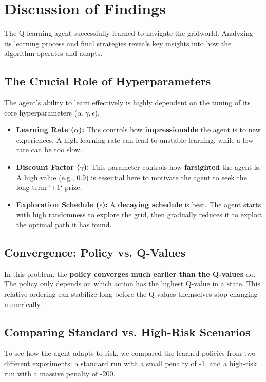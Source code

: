 \documentclass[11pt, a4paper]{article}
\begin{document}
\section{Discussion of Findings}
The Q-learning agent successfully learned to navigate the gridworld. Analyzing its learning process and final strategies reveals key insights into how the algorithm operates and adapts.

\subsection{The Crucial Role of Hyperparameters}
The agent's ability to learn effectively is highly dependent on the tuning of its core hyperparameters ($\alpha, \gamma, \epsilon$).
\begin{itemize}
    \item \textbf{Learning Rate ($\alpha$):} This controls how \textbf{impressionable} the agent is to new experiences. A high learning rate can lead to unstable learning, while a low rate can be too slow.
    
    \item \textbf{Discount Factor ($\gamma$):} This parameter controls how \textbf{farsighted} the agent is. A high value (e.g., 0.9) is essential here to motivate the agent to seek the long-term `+1` prize.
    
    \item \textbf{Exploration Schedule ($\epsilon$):} A \textbf{decaying schedule} is best. The agent starts with high randomness to explore the grid, then gradually reduces it to exploit the optimal path it has found.
\end{itemize}

\subsection{Convergence: Policy vs. Q-Values}
In this problem, the \textbf{policy converges much earlier than the Q-values} do. The policy only depends on which action has the highest Q-value in a state. This relative ordering can stabilize long before the Q-values themselves stop changing numerically.

\subsection{Comparing Standard vs. High-Risk Scenarios}
To see how the agent adapts to risk, we compared the learned policies from two different experiments: a standard run with a small penalty of -1, and a high-risk run with a massive penalty of -200.
\end{document}
